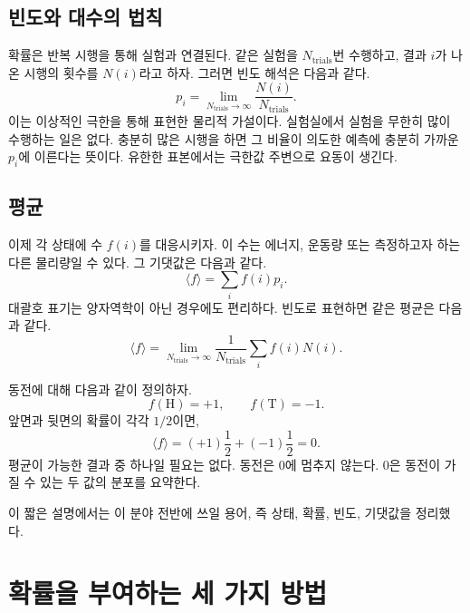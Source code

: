 \subsection{빈도와 대수의 법칙}

확률은 반복 시행을 통해 실험과 연결된다. 같은 실험을 \(N_{\mathrm{trials}}\)번 수행하고, 결과 \(i\)가 나온 시행의 횟수를 \(N(i)\)라고 하자. 그러면 빈도 해석은 다음과 같다.
\begin{equation}
 p_i=
 \lim_{N_{\mathrm{trials}}\to\infty}
 \frac{N(i)}{N_{\mathrm{trials}}}.
 \label{eq:sm1-frequency}
\end{equation}
이는 이상적인 극한을 통해 표현한 물리적 가설이다. 실험실에서 실험을 무한히 많이 수행하는 일은 없다. 충분히 많은 시행을 하면 그 비율이 의도한 예측에 충분히 가까운 \(p_i\)에 이른다는 뜻이다. 유한한 표본에서는 극한값 주변으로 요동이 생긴다.

\subsection{평균}

이제 각 상태에 수 \(f(i)\)를 대응시키자. 이 수는 에너지, 운동량 또는 측정하고자 하는 다른 물리량일 수 있다. 그 기댓값은 다음과 같다.
\begin{equation}
 \langle f\rangle=\sum_i f(i)p_i.
 \label{eq:sm1-expectation}
\end{equation}
대괄호 표기는 양자역학이 아닌 경우에도 편리하다. 빈도로 표현하면 같은 평균은 다음과 같다.
\begin{equation}
 \langle f\rangle
 =
 \lim_{N_{\mathrm{trials}}\to\infty}
 \frac{1}{N_{\mathrm{trials}}}
 \sum_i f(i)N(i).
 \label{eq:sm1-frequency-average}
\end{equation}

동전에 대해 다음과 같이 정의하자.
\begin{equation}
 f(\mathrm{H})=+1,
 \qquad
 f(\mathrm{T})=-1.
\end{equation}
앞면과 뒷면의 확률이 각각 \(1/2\)이면,
\begin{equation}
 \langle f\rangle
 =(+1)\frac12+(-1)\frac12=0.
\end{equation}
평균이 가능한 결과 중 하나일 필요는 없다. 동전은 0에 멈추지 않는다. 0은 동전이 가질 수 있는 두 값의 분포를 요약한다.

이 짧은 설명에서는 이 분야 전반에 쓰일 용어, 즉 상태, 확률, 빈도, 기댓값을 정리했다.

\section{확률을 부여하는 세 가지 방법}

